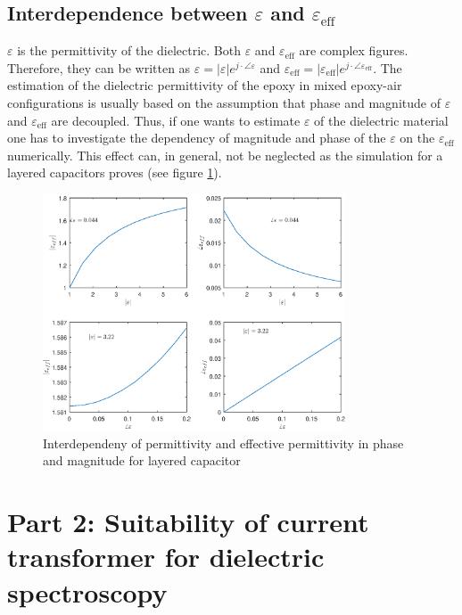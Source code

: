 \subsection{Interdependence between $\varepsilon$ and $\varepsilon_{\textrm{eff}}$} 
$\varepsilon$ is the permittivity of the dielectric. Both $\varepsilon$ and $\varepsilon_{\textrm{eff}}$ are complex figures. Therefore, they can be written as $\varepsilon = |\varepsilon| e^{j \cdot \angle \varepsilon} $ and $\varepsilon_{\textrm{eff}} = |\varepsilon_{\textrm{eff}}| e^{j \cdot \angle \varepsilon_{\textrm{eff}}} $.	
The estimation of the dielectric permittivity of the epoxy in mixed epoxy-air configurations is usually based on the assumption that phase and magnitude of $\varepsilon$ and $\varepsilon_{\textrm{eff}}$ are decoupled. Thus, if one wants to estimate $\varepsilon$ of the dielectric material one has to investigate the dependency of magnitude and phase of the $\varepsilon$ on the $\varepsilon_{\textrm{eff}}$ numerically. This effect can, in general, not be neglected as the simulation for a layered capacitors proves (see figure \ref{fig.layered}).  
\begin{figure}

	\includegraphics[width=0.8\textwidth]{figures/Theory/layereddielectrics.eps}
	\caption[Kurze Abbildungsbeschreibung]{Interdependeny of permittivity and effective permittivity in phase and magnitude for layered capacitor}
	\label{fig.layered}
\end{figure}
	
	
\section{Part 2: Suitability of current transformer for dielectric spectroscopy}
